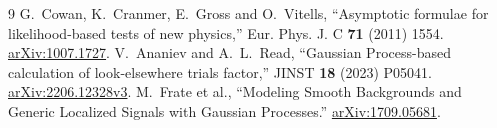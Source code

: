 \documentclass[11pt]{article}
\begin{document}
\begin{thebibliography}{9}
 G.~Cowan, K.~Cranmer, E.~Gross and O.~Vitells, ``Asymptotic formulae for likelihood-based tests of new physics,'' Eur. Phys. J. C \textbf{71} (2011) 1554. \href{https://arxiv.org/abs/1007.1727}{arXiv:1007.1727}.
 V.~Ananiev and A.~L.~Read, ``Gaussian Process-based calculation of look-elsewhere trials factor,'' JINST \textbf{18} (2023) P05041. \href{https://arxiv.org/abs/2206.12328v3}{arXiv:2206.12328v3}.
 M.~Frate et al., ``Modeling Smooth Backgrounds and Generic Localized Signals with Gaussian Processes.'' \href{https://arxiv.org/abs/1709.05681}{arXiv:1709.05681}.
\end{thebibliography}
\end{document}
